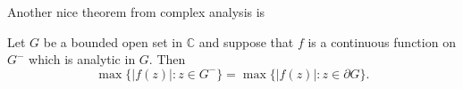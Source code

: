 Another nice theorem from complex analysis is

\begin{theorem}
Let $G$ be a bounded open set in $\mathbb{C}$ and suppose that $f$ is a continuous function on $G^-$ which is analytic in $G$. Then
\[
\max\{|f(z)|:z\in G^-\}=\max \{|f(z)|:z\in \partial G \}.
\]
\end{theorem}

\newcommand{\abc}{abcdefgh\hbar\hslash i\imath j\jmath klmnopqrstuvwxyz}
\newcommand{\ABC}{ABCDEFGHIJKLMNOPQRSTUVWXYZ}
\newcommand{\alphabeta}{\alpha\beta\varbeta\gamma\delta\epsilon\varepsilon\zeta\eta\theta\vartheta\iota\kappa\varkappa\lambda\mu\nu\xi o\pi\varpi\rho\varrho\sigma\varsigma\tau\upsilon\phi\varphi\chi\psi\omega}
\newcommand{\AlphaBeta}{\Gamma\Delta\Theta\Lambda\Xi\Pi\Sigma\Upsilon\Phi\Psi\Omega}










